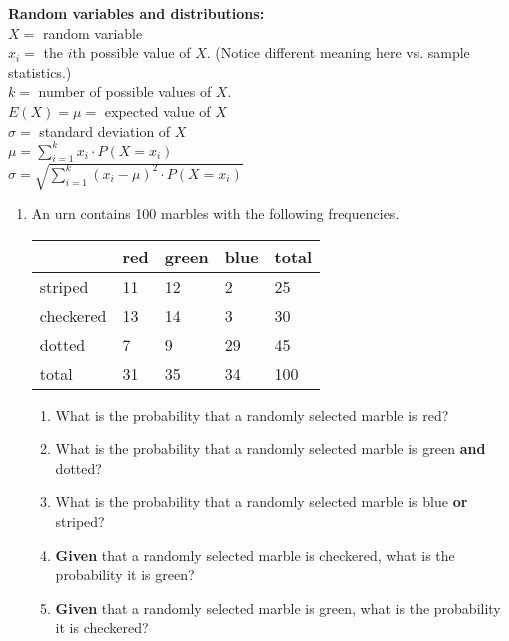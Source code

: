 \documentclass[12pt,letterpaper]{article}
\begin{document}
{\bf Random variables and distributions:}\\
$X=$ random variable \\
$x_i=$ the $i$th possible value of $X$. (Notice different meaning here vs. sample statistics.)\\
$k=$ number of possible values of $X$.\\
$E(X)=\mu=$ expected value of $X$\\
$\sigma=$ standard deviation of $X$\\
$\mu = \sum_{i=1}^k  x_i \cdot P(X=x_i) $\\
$\sigma = \sqrt{\sum_{i=1}^k (x_i-\mu)^2 \cdot P(X=x_i)}$


\newpage


\begin{enumerate}
\item An urn contains 100 marbles with the following frequencies.
\begin{center}
\renewcommand{\arraystretch}{1.5}
\begin{tabularx}{0.9\textwidth}{|Y|Y Y Y|Y|} \hline
             & red  & green  & blue  & total \\\hline
striped      & 11   & 12     & 2     & 25    \\ 
checkered    & 13   & 14     & 3     & 30    \\
dotted       &  7   &  9     & 29    & 45   \\\hline
total        & 31   & 35     & 34    & 100   \\\hline
\end{tabularx}
\end{center}
\begin{enumerate}
\item What is the probability that a randomly selected marble is red?
\vfill
\item What is the probability that a randomly selected marble is green {\bf and} dotted?
\vfill
\item What is the probability that a randomly selected marble is blue {\bf or} striped?
\vfill
\item {\bf Given} that a randomly selected marble is checkered, what is the probability it is green?
\vfill
\item {\bf Given} that a randomly selected marble is green, what is the probability it is checkered?
\vfill
\end{enumerate}

\newpage


\end{enumerate}
\end{document}
